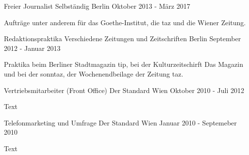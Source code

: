 \begin{cventries}
  \cventry
    {Freier Journalist} %
    {Selbständig} %
    {Berlin} %
    {Oktober 2013 - März 2017} %
    {
      \begin{cvitems} %
        \item {Aufträge unter anderem für das Goethe-Institut, die taz und die Wiener Zeitung.}
       \end{cvitems}
    }

 \cventry
    {Redaktionspraktika} %
    {Verschiedene Zeitungen und Zeitschriften} %
    {Berlin} %
    {September 2012 - Januar 2013} %
    { 
      \begin{cvitems} %
        \item {Praktika beim Berliner Stadtmagazin tip, bei der Kulturzeitschirft Das Magazin und bei der sonntaz, der Wochenendbeilage der Zeitung taz.}
      \end{cvitems}
    }

  \cventry
    {Vertriebsmitarbeiter (Front Office)} %
    {Der Standard} %
    {Wien} %
    {Oktober 2010 - Juli 2012} %
    {
      \begin{cvitems} %
        \item {Text}
      \end{cvitems}
    }

\cventry
{Telefonmarketing und Umfrage} %
{Der Standard} %
{Wien} %
{Januar 2010 - Septemeber 2010} %
{
  \begin{cvitems} %
    \item {Text}
  \end{cvitems}
}

\end{cventries}
